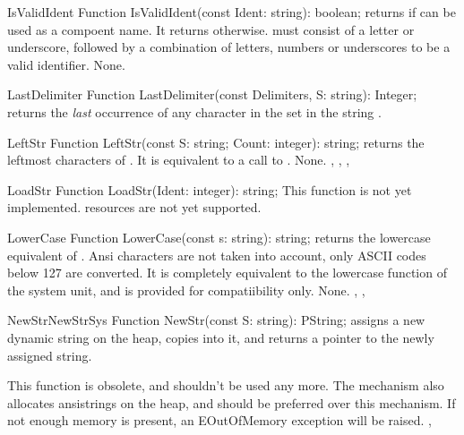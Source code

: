 

\begin{function}{IsValidIdent}
\Declaration
Function IsValidIdent(const Ident: string): boolean;
\Description
{} returns  if  can be used as a
compoent name. It returns  otherwise.  must consist of
a letter or underscore, followed by a combination of letters, numbers or
underscores to be a valid identifier.
\Errors
None.
\SeeAlso
\end{function}



\begin{function}{LastDelimiter}
\Declaration
Function LastDelimiter(const Delimiters, S: string): Integer;
\Description
{} returns the {\em last} occurrence of any character in
the set  in the string .
\Errors
\SeeAlso
\end{function}



\begin{function}{LeftStr}
\Declaration
Function LeftStr(const S: string; Count: integer): string;
\Description
{} returns the  leftmost characters of .
It is equivalent to a call to .
\Errors
None.
\SeeAlso
{}, , , 
\end{function}



\begin{function}{LoadStr}
\Declaration
Function LoadStr(Ident: integer): string;
\Description
This function is not yet implemented. resources are not yet supported.
\Errors
\SeeAlso
\end{function}

\begin{function}{LowerCase}
\Declaration
Function LowerCase(const s: string): string;
\Description
{} returns the lowercase equivalent of . Ansi characters
are not taken into account, only ASCII codes below 127 are converted. It is
completely equivalent to the lowercase function of the system unit, and is
provided for compatiibility only.
\Errors
None.
\SeeAlso
{}, , 
\end{function}



\begin{functionl}{NewStr}{NewStrSys}
\Declaration
Function NewStr(const S: string): PString;
\Description
{} assigns a new dynamic string on the heap, copies  into
it, and returns a pointer to the newly assigned string.

This function is obsolete, and shouldn't be used any more. The
 mechanism also allocates ansistrings on the heap, and
should be preferred over this mechanism.
\Errors
If not enough memory is present, an EOutOfMemory exception will be raised.
\SeeAlso
{}, 
\end{functionl}

